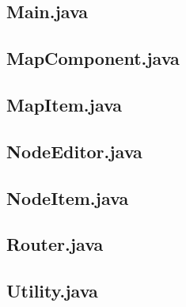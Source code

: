\documentclass[12pt,letterpaper,titlepage]{article}   %
\begin{document}
\begin{spacing}{0.7}
\subsection{Main.java}
\begin{lgrind}

\end{lgrind}

\subsection{MapComponent.java}
\begin{lgrind}

\end{lgrind}

\subsection{MapItem.java}
\begin{lgrind}

\end{lgrind}

\subsection{NodeEditor.java}
\begin{lgrind}

\end{lgrind}

\subsection{NodeItem.java}
\begin{lgrind}

\end{lgrind}

\subsection{Router.java}
\begin{lgrind}

\end{lgrind}

\subsection{Utility.java}
\begin{lgrind}

\end{lgrind}



\normalsize
\end{spacing}
\doublespacing
\end{document}
